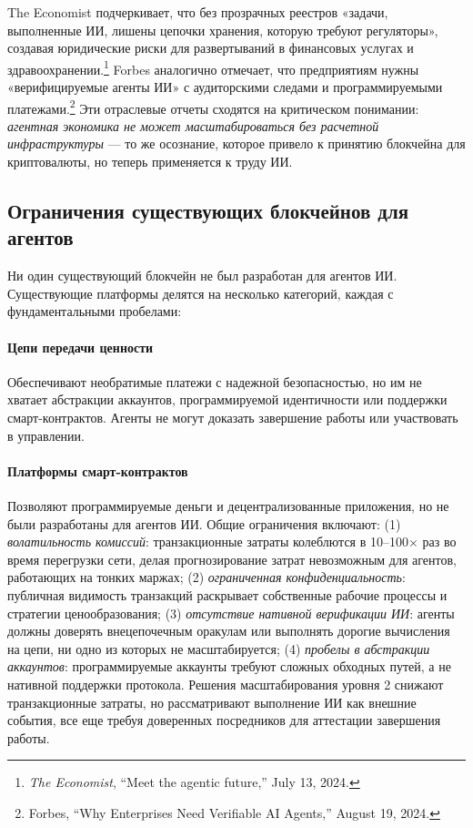 \documentclass[11pt]{article}
\begin{document}
The Economist подчеркивает, что без прозрачных реестров «задачи, выполненные ИИ, лишены цепочки хранения, которую требуют регуляторы», создавая юридические риски для развертываний в финансовых услугах и здравоохранении.\footnote{\emph{The Economist}, ``Meet the agentic future,'' July 13, 2024.} Forbes аналогично отмечает, что предприятиям нужны «верифицируемые агенты ИИ» с аудиторскими следами и программируемыми платежами.\footnote{Forbes, ``Why Enterprises Need Verifiable AI Agents,'' August 19, 2024.} Эти отраслевые отчеты сходятся на критическом понимании: \emph{агентная экономика не может масштабироваться без расчетной инфраструктуры} — то же осознание, которое привело к принятию блокчейна для криптовалюты, но теперь применяется к труду ИИ.

\subsection{Ограничения существующих блокчейнов для агентов}
Ни один существующий блокчейн не был разработан для агентов ИИ. Существующие платформы делятся на несколько категорий, каждая с фундаментальными пробелами:

\paragraph{Цепи передачи ценности} Обеспечивают необратимые платежи с надежной безопасностью, но им не хватает абстракции аккаунтов, программируемой идентичности или поддержки смарт-контрактов. Агенты не могут доказать завершение работы или участвовать в управлении.

\paragraph{Платформы смарт-контрактов} Позволяют программируемые деньги и децентрализованные приложения, но не были разработаны для агентов ИИ. Общие ограничения включают: (1) \emph{волатильность комиссий}: транзакционные затраты колеблются в 10--100$\times$ раз во время перегрузки сети, делая прогнозирование затрат невозможным для агентов, работающих на тонких маржах; (2) \emph{ограниченная конфиденциальность}: публичная видимость транзакций раскрывает собственные рабочие процессы и стратегии ценообразования; (3) \emph{отсутствие нативной верификации ИИ}: агенты должны доверять внецепочечным оракулам или выполнять дорогие вычисления на цепи, ни одно из которых не масштабируется; (4) \emph{пробелы в абстракции аккаунтов}: программируемые аккаунты требуют сложных обходных путей, а не нативной поддержки протокола. Решения масштабирования уровня 2 снижают транзакционные затраты, но рассматривают выполнение ИИ как внешние события, все еще требуя доверенных посредников для аттестации завершения работы.
\end{document}
